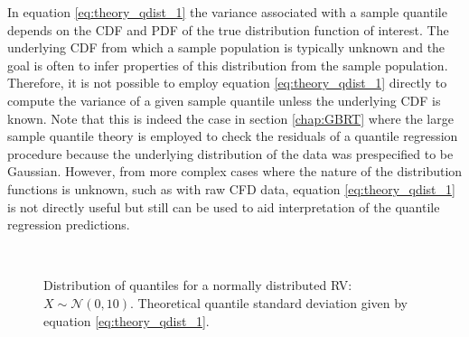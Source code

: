 In equation \ref{eq:theory_qdist_1} the variance associated with a sample quantile depends on the CDF and PDF of the true distribution function of interest.  The underlying CDF from which a sample population is typically unknown and the goal is often to infer properties of this distribution from the sample population.  Therefore, it is not possible to employ equation \ref{eq:theory_qdist_1} directly to compute the variance of a given sample quantile unless the underlying CDF is known.  Note that this is indeed the case in section \ref{chap:GBRT} where the large sample quantile theory is employed to check the residuals of a quantile regression procedure because the underlying distribution of the data was prespecified to be Gaussian.  However, from more complex cases where the nature of the distribution functions is unknown, such as with raw CFD data, equation  \ref{eq:theory_qdist_1} is not directly useful but still can be used to aid interpretation of the quantile regression predictions.

\begin{figure}[H]%
    \captionsetup[subfigure]{justification=centering}
    \centering
        \hspace*{-1.0em}%
        \hspace*{-1.0em}%
        \\
        \hspace*{-1.0em}%
    \qquad
    \caption[Distribution of quantiles for a normally distributed RV.]{Distribution of quantiles for a normally distributed RV: $X \sim \mathcal{N}(0, 10)$.  Theoretical quantile standard deviation given by equation \ref{eq:theory_qdist_1}.}%
    \label{fig:normal_q_theory}%
\end{figure}

